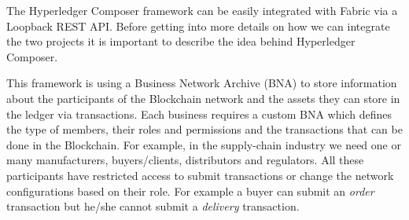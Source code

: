 The Hyperledger Composer framework can be easily integrated with Fabric via a Loopback REST API. Before getting into more details on how we can integrate the two projects it is important to describe the idea behind Hyperledger Composer.

This framework is using a Business Network Archive (BNA) to store information about the participants of the Blockchain network and the assets they can store in the ledger via transactions. Each business requires a custom BNA which defines the type of members, their roles and permissions and the transactions that can be done in the Blockchain. For example, in the supply-chain industry we need one or many manufacturers, buyers/clients, distributors and regulators. All these participants have restricted access to submit transactions or change the network configurations based on their role. For example a buyer can submit an \emph{order} transaction but he/she cannot submit a \emph{delivery} transaction.


